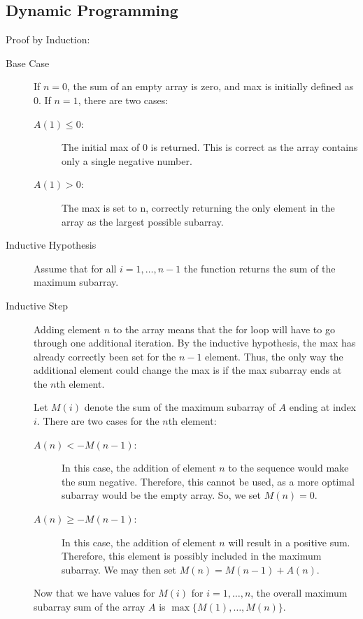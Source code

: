 \documentclass[12pt,letterpaper]{article}
\begin{document}
\subsection{Dynamic Programming}
Proof by Induction:
\begin{description}
  \item[Base Case] If $n=0$, the sum of an empty array is zero, and max is
    initially defined as $0$. If $n=1$, there are two cases:
    \begin{description}
      \item[$A(1) \leq 0$:] The initial max of $0$ is returned. This is correct
        as the array contains only a single negative number.
      \item[$A(1) > 0$:] The max is set to n, correctly returning the only
        element in the array as the largest possible subarray.
    \end{description}
  \item[Inductive Hypothesis] Assume that for all $i=1,\ldots,n-1$ the function
    returns the sum of the maximum subarray.
  \item[Inductive Step]

    Adding element $n$ to the array means that the for loop will have to go
    through one additional iteration.  By the inductive hypothesis, the max has
    already correctly been set for the $n - 1$ element. Thus, the only way the
    additional element could change the max is if the max subarray ends at the
    $n$th element.
        
    Let $M(i)$ denote the sum of the maximum subarray of $A$ ending at index
    $i$.  There are two cases for the $n$th element:
    
    \begin{description}
      \item[$A(n) < -M(n-1)$:] In this case, the addition of element $n$ to
        the sequence would make the sum negative. Therefore, this cannot be
        used, as a more optimal subarray would be the empty array. So,
        we set $M(n) = 0$.

      \item[$A(n) \geq -M(n-1)$:] In this case, the addition of element $n$ will
        result in a positive sum. Therefore, this element is possibly included
        in the maximum subarray. We may then set $M(n) = M(n-1) + A(n)$.
    \end{description}

    Now that we have values for $M(i)$ for $i=1,\ldots,n$, the overall maximum
    subarray sum of the array $A$ is $\max \{ M(1), \ldots, M(n) \}$.
\end{description}
\end{document}
